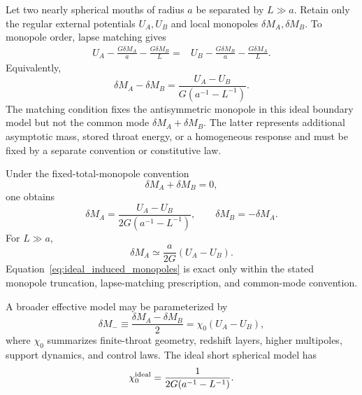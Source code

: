 \documentclass[journal,a4paper]{IEEEtran}
\begin{document}
Let two nearly spherical mouths of radius \(a\) be separated by \(L\gg a\). Retain only the regular external potentials \(U_A,U_B\) and local monopoles \(\delta M_A,\delta M_B\). To monopole order, lapse matching gives
\begin{equation}
\begin{split}
U_A-\frac{G\delta M_A}{a}-\frac{G\delta M_B}{L}
={}&
U_B-\frac{G\delta M_B}{a}-\frac{G\delta M_A}{L}.
\label{eq:monopole_matching}
\end{split}
\end{equation}
Equivalently,
\begin{equation}
    \delta M_A-\delta M_B
    =\frac{U_A-U_B}
    {G(a^{-1}-L^{-1})}.
    \label{eq:antisymmetric_monopole}
\end{equation}
The matching condition fixes the antisymmetric monopole in this ideal boundary model but not the common mode \(\delta M_A+\delta M_B\). The latter represents additional asymptotic mass, stored throat energy, or a homogeneous response and must be fixed by a separate convention or constitutive law.

Under the fixed-total-monopole convention
\begin{equation}
    \delta M_A+\delta M_B=0,
    \label{eq:zero_sum_monopole}
\end{equation}
one obtains
\begin{equation}
    \boxed{
    \delta M_A
    =\frac{U_A-U_B}
    {2G(a^{-1}-L^{-1})},
    \qquad
    \delta M_B=-\delta M_A.
    }
    \label{eq:ideal_induced_monopoles}
\end{equation}
For \(L\gg a\),
\begin{equation}
    \delta M_A\simeq\frac{a}{2G}(U_A-U_B).
\end{equation}
Equation~\eqref{eq:ideal_induced_monopoles} is exact only within the stated monopole truncation, lapse-matching prescription, and common-mode convention.

A broader effective model may be parameterized by
\begin{equation}
    \delta M_-
    \equiv\frac{\delta M_A-\delta M_B}{2}
    =\chi_0(U_A-U_B),
    \label{eq:susceptibility}
\end{equation}
where \(\chi_0\) summarizes finite-throat geometry, redshift layers, higher multipoles, support dynamics, and control laws. The ideal short spherical model has
\begin{equation}
    \chi_0^{\rm ideal}
    =\frac{1}{2G(a^{-1}-L^{-1})}.
\end{equation}
\end{document}
